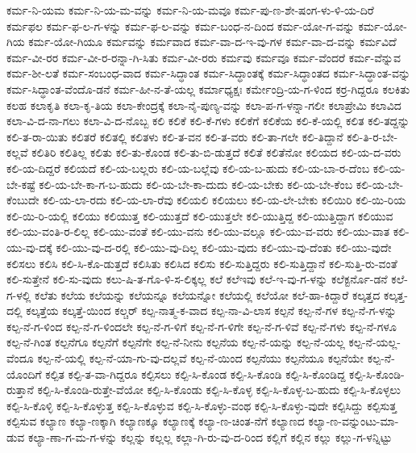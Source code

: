 {ಕರ್ಮ-ನಿ-ಯಮ
ಕರ್ಮ-ನಿ-ಯ-ಮ-ವನ್ನು
ಕರ್ಮ-ನಿ-ಯ-ಮವೂ
ಕರ್ಮ-ಪು-ಣ-ಶೇ-ಷಂಗ-ಳು-ಳಿ-ಯ-ದಿರೆ
ಕರ್ಮಫಲ
ಕರ್ಮ-ಫ-ಲ-ಗ-ಳನ್ನು
ಕರ್ಮ-ಫ-ಲ-ವನ್ನು
ಕರ್ಮ-ಬಂಧ-ನ-ದಿಂದ
ಕರ್ಮ-ಯೋ-ಗ-ವನ್ನು
ಕರ್ಮ-ಯೋ-ಗಿಯ
ಕರ್ಮ-ಯೋ-ಗಿಯೂ
ಕರ್ಮವನ್ನು
ಕರ್ಮವಾದ
ಕರ್ಮ-ವಾ-ದ-ಇ-ವು-ಗಳ
ಕರ್ಮ-ವಾ-ದ-ವನ್ನು
ಕರ್ಮವಿದೆ
ಕರ್ಮ-ವೀ-ರರ
ಕರ್ಮ-ವೀ-ರ-ರನ್ನಾ-ಗಿ-ಸಿತು
ಕರ್ಮ-ವೀ-ರರು
ಕರ್ಮವು
ಕರ್ಮವೂ
ಕರ್ಮ-ವೆಂದರೆ
ಕರ್ಮ-ವೆನ್ನುವ
ಕರ್ಮ-ಶೀ-ಲತೆ
ಕರ್ಮ-ಸಂಬಂಧ-ವಾದ
ಕರ್ಮ-ಸಿದ್ಧಾಂತ
ಕರ್ಮ-ಸಿದ್ಧಾಂತಕ್ಕೆ
ಕರ್ಮ-ಸಿದ್ಧಾಂತದ
ಕರ್ಮ-ಸಿದ್ಧಾಂತ-ವನ್ನು
ಕರ್ಮ-ಸಿದ್ಧಾಂತ-ವೆಂದೊ-ಡನೆ
ಕರ್ಮ-ಹೀ-ನ-ತೆ-ಯಲ್ಲ
ಕರ್ಮಾಧ್ಯಕ್ಷಃ
ಕರ್ಮೇಂದ್ರಿ-ಯ-ಗ-ಳಿಂದ
ಕರ್ರ-ಗಿದ್ದರೂ
ಕಲಕಿತು
ಕಲಹ
ಕಲಾಕೃತಿ
ಕಲಾ-ಕೃ-ತಿಯ
ಕಲಾ-ಕೇಂದ್ರಕ್ಕೆ
ಕಲಾ-ನೈ-ಪುಣ್ಯ-ವನ್ನು
ಕಲಾ-ಪ-ಗ-ಳನ್ನಾ-ಗಲೀ
ಕಲಾಪ್ರೇಮಿ
ಕಲಾವಿದ
ಕಲಾ-ವಿ-ದ-ನಾ-ಗಲು
ಕಲಾ-ವಿ-ದ-ನೊಬ್ಬ
ಕಲಿ
ಕಲಿಕೆ
ಕಲಿ-ಕೆ-ಗಳು
ಕಲಿಕೆಗೆ
ಕಲಿಕೆಯ
ಕಲಿ-ಕೆ-ಯಲ್ಲಿ
ಕಲಿತ
ಕಲಿ-ತದ್ದನ್ನು
ಕಲಿ-ತ-ರಾ-ಯಿತು
ಕಲಿತರೆ
ಕಲಿತಲ್ಲಿ
ಕಲಿತಳು
ಕಲಿ-ತ-ವನ
ಕಲಿ-ತ-ವರು
ಕಲಿ-ತಾ-ಗಲೇ
ಕಲಿ-ತಿದ್ದಾನೆ
ಕಲಿ-ತಿ-ರ-ಬೇ-ಕಲ್ಲವೆ
ಕಲಿತಿರಿ
ಕಲಿತಿಲ್ಲ
ಕಲಿತು
ಕಲಿ-ತು-ಕೊಂಡ
ಕಲಿ-ತು-ಬಿ-ಡುತ್ತದೆ
ಕಲಿತೆ
ಕಲಿತೆನೋ
ಕಲಿಯದ
ಕಲಿ-ಯ-ದ-ವರು
ಕಲಿ-ಯ-ದಿದ್ದರೆ
ಕಲಿಯದೆ
ಕಲಿ-ಯ-ಬಲ್ಲರು
ಕಲಿ-ಯ-ಬಲ್ಲೆವು
ಕಲಿ-ಯ-ಬ-ಹುದು
ಕಲಿ-ಯ-ಬಾ-ರ-ದೆಂಬ
ಕಲಿ-ಯ-ಬೇ-ಕಷ್ಟೆ
ಕಲಿ-ಯ-ಬೇ-ಕಾ-ಗ-ಬ-ಹುದು
ಕಲಿ-ಯ-ಬೇ-ಕಾ-ದುದು
ಕಲಿ-ಯ-ಬೇಕು
ಕಲಿ-ಯ-ಬೇ-ಕೆಂಬ
ಕಲಿ-ಯ-ಬೇ-ಕೆಂಬುದೇ
ಕಲಿ-ಯ-ಲಾ-ರದು
ಕಲಿ-ಯ-ಲಾ-ರೆವು
ಕಲಿಯಲಿ
ಕಲಿಯಲು
ಕಲಿ-ಯ-ಲೇ-ಬೇಕು
ಕಲಿಯಿರಿ
ಕಲಿ-ಯಿ-ರಿಯ
ಕಲಿ-ಯಿ-ರಿ-ಯಲ್ಲಿ
ಕಲಿಯು
ಕಲಿಯುತ್ತ
ಕಲಿ-ಯುತ್ತದೆ
ಕಲಿ-ಯುತ್ತಲೇ
ಕಲಿ-ಯುತ್ತಿದ್ದ
ಕಲಿ-ಯುತ್ತಿದ್ದಾಗ
ಕಲಿಯುವ
ಕಲಿ-ಯು-ವಂತಿ-ರ-ಲಿಲ್ಲ
ಕಲಿ-ಯು-ವಂತೆ
ಕಲಿ-ಯು-ವನು
ಕಲಿ-ಯು-ವಲ್ಲೂ
ಕಲಿ-ಯು-ವ-ವರು
ಕಲಿ-ಯು-ವಾತ
ಕಲಿ-ಯು-ವು-ದಕ್ಕೆ
ಕಲಿ-ಯು-ವು-ದ-ರಲ್ಲಿ
ಕಲಿ-ಯು-ವು-ದಿಲ್ಲ
ಕಲಿ-ಯು-ವುದು
ಕಲಿ-ಯು-ವು-ದೆಂತು
ಕಲಿ-ಯು-ವುದೇ
ಕಲಿಸಲು
ಕಲಿಸಿ
ಕಲಿ-ಸಿ-ಕೊ-ಡುತ್ತದೆ
ಕಲಿಸಿತು
ಕಲಿಸಿದ
ಕಲಿಸು
ಕಲಿ-ಸುತ್ತಿದ್ದರು
ಕಲಿ-ಸುತ್ತಿದ್ದಾನೆ
ಕಲಿ-ಸುತ್ತಿ-ರು-ವಂತೆ
ಕಲಿ-ಸುತ್ತೇನೆ
ಕಲಿ-ಸು-ವುದು
ಕಲು-ಷಿ-ತ-ಗೊ-ಳಿ-ಸ-ಲಿಕ್ಕಲ್ಲ
ಕಲೆ
ಕಲೆಇವು
ಕಲೆ-ಇ-ವು-ಗ-ಳನ್ನು
ಕಲೆಕ್ಟರ್ನೊ-ಡನೆ
ಕಲೆ-ಗ-ಳಲ್ಲಿ
ಕಲೆತು
ಕಲೆಯ
ಕಲೆಯನ್ನು
ಕಲೆಯನ್ನೂ
ಕಲೆಯನ್ನೋ
ಕಲೆಯಲ್ಲಿ
ಕಲೆಯೋ
ಕಲೆ-ಹಾ-ಕಿದ್ದಾರೆ
ಕಲ್ಕತ್ತದ
ಕಲ್ಕತ್ತ-ದಲ್ಲಿ
ಕಲ್ಕತ್ತೆಯ
ಕಲ್ಕತ್ತೆ-ಯಿಂದ
ಕಲ್ಚರ್
ಕಲ್ಪ-ನಾತ್ಮ-ಕ-ವಾದ
ಕಲ್ಪ-ನಾ-ವಿ-ಲಾಸ
ಕಲ್ಪನೆ
ಕಲ್ಪ-ನೆ-ಗಳ
ಕಲ್ಪ-ನೆ-ಗ-ಳನ್ನು
ಕಲ್ಪ-ನೆ-ಗ-ಳಿಂದ
ಕಲ್ಪ-ನೆ-ಗ-ಳಿಂದಲೇ
ಕಲ್ಪ-ನೆ-ಗ-ಳಿಗೆ
ಕಲ್ಪ-ನೆ-ಗ-ಳಿಗೇ
ಕಲ್ಪ-ನೆ-ಗ-ಳಿವೆ
ಕಲ್ಪ-ನೆ-ಗಳು
ಕಲ್ಪ-ನೆ-ಗಳೂ
ಕಲ್ಪ-ನೆ-ಗಿಂತ
ಕಲ್ಪನೆಗೂ
ಕಲ್ಪನೆಗೆ
ಕಲ್ಪನೆಗೇ
ಕಲ್ಪ-ನೆ-ನೀನು
ಕಲ್ಪನೆಯ
ಕಲ್ಪ-ನೆ-ಯನ್ನು
ಕಲ್ಪ-ನೆ-ಯಲ್ಲ
ಕಲ್ಪ-ನೆ-ಯಲ್ಲ-ವೆಂದೂ
ಕಲ್ಪ-ನೆ-ಯಲ್ಲಿ
ಕಲ್ಪ-ನೆ-ಯಾ-ಗು-ವು-ದಲ್ಲವೆ
ಕಲ್ಪ-ನೆ-ಯಿಂದ
ಕಲ್ಪನೆಯು
ಕಲ್ಪನೆಯೂ
ಕಲ್ಪನೆಯೇ
ಕಲ್ಪ-ನೆ-ಯೊಂದಿಗೆ
ಕಲ್ಪಿತ
ಕಲ್ಪಿ-ತ-ವಾ-ಗಿದ್ದರೂ
ಕಲ್ಪಿಸಲು
ಕಲ್ಪಿ-ಸಿ-ಕೊಂಡ
ಕಲ್ಪಿ-ಸಿ-ಕೊಂಡಿ
ಕಲ್ಪಿ-ಸಿ-ಕೊಂಡಿದ್ದ
ಕಲ್ಪಿ-ಸಿ-ಕೊಂಡಿ-ರುತ್ತಾನೆ
ಕಲ್ಪಿ-ಸಿ-ಕೊಂಡಿ-ರುತ್ತೇ-ವೆಯೋ
ಕಲ್ಪಿ-ಸಿ-ಕೊಂಡು
ಕಲ್ಪಿ-ಸಿ-ಕೊಳ್ಳ
ಕಲ್ಪಿ-ಸಿ-ಕೊಳ್ಳ-ಬ-ಹುದು
ಕಲ್ಪಿ-ಸಿ-ಕೊಳ್ಳಲು
ಕಲ್ಪಿ-ಸಿ-ಕೊಳ್ಳಿ
ಕಲ್ಪಿ-ಸಿ-ಕೊಳ್ಳುತ್ತ
ಕಲ್ಪಿ-ಸಿ-ಕೊಳ್ಳುವ
ಕಲ್ಪಿ-ಸಿ-ಕೊಳ್ಳು-ವಂಥ
ಕಲ್ಪಿ-ಸಿ-ಕೊಳ್ಳು-ವುದೇ
ಕಲ್ಪಿಸಿದ್ದು
ಕಲ್ಪಿಸುತ್ತ
ಕಲ್ಪಿಸುವ
ಕಲ್ಯಾಣ
ಕಲ್ಯಾ-ಣಕ್ಕಾಗಿ
ಕಲ್ಯಾಣಕ್ಕೂ
ಕಲ್ಯಾಣಕ್ಕೆ
ಕಲ್ಯಾ-ಣ-ಚಿಂತ-ನೆಗೆ
ಕಲ್ಯಾಣದ
ಕಲ್ಯಾ-ಣ-ವನ್ನುಂಟು-ಮಾ-ಡುವ
ಕಲ್ಯಾ-ಣಾ-ಗ-ಮ-ಗ-ಳನ್ನು
ಕಲ್ಲನ್ನು
ಕಲ್ಲಲ್ಲ
ಕಲ್ಲಾ-ಗಿ-ರು-ವು-ದ-ರಿಂದ
ಕಲ್ಲಿಗೆ
ಕಲ್ಲಿನ
ಕಲ್ಲು
ಕಲ್ಲು-ಗ-ಳನ್ನಿಟ್ಟು
}
